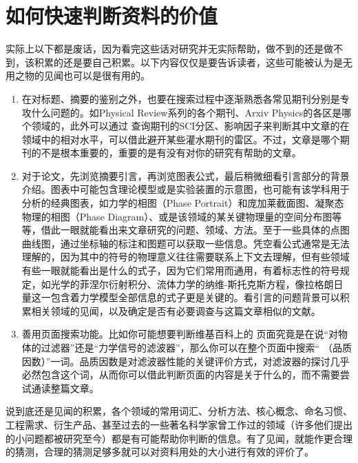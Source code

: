 \documentclass[a4paper,10pt,english]{sphinxmanual}
\begin{document}
\section{如何快速判断资料的价值}
\label{\detokenize{5. GetInfo:id4}}
实际上以下都是废话，因为看完这些话对研究并无实际帮助，做不到的还是做不到，该积累的还是要自己积累。以下内容仅仅是要告诉读者，这些可能被认为是无用之物的见闻也可以是很有用的。
\begin{enumerate}
\item {} 
在对标题、摘要的鉴别之外，也要在搜索过程中逐渐熟悉各常见期刊分别是专攻什么问题的。如Physical Review系列的各个期刊、Arxiv Physics的各区是哪个领域的，此外可以通过  查询期刊的SCI分区、影响因子来判断其中文章的在领域中的相对水平，可以借此避开某些灌水期刊的雷区。不过，文章是哪个期刊的不是根本重要的，重要的是有没有对你的研究有帮助的文章。

\item {} 
对于论文，先浏览摘要引言，再浏览图表公式，最后稍微细看引言部分的背景介绍。图表中可能包含理论模型或是实验装置的示意图，也可能有该学科用于分析的经典图表，如力学的相图（Phase Portrait）和庞加莱截面图、凝聚态物理的相图（Phase Diagram）、或是该领域的某关键物理量的空间分布图等等，借此一眼就能看出来文章研究的问题、领域、方法。至于一些具体的点图曲线图，通过坐标轴的标注和图题可以获取一些信息。凭空看公式通常是无法理解的，因为其中的符号的物理意义往往需要联系上下文去理解，但有些领域有些一眼就能看出是什么的式子，因为它们常用而通用，有着标志性的符号规定，如光学的菲涅尔衍射积分、流体力学的纳维-斯托克斯方程，像拉格朗日量这一包含着力学模型全部信息的式子更是关键的。看引言的问题背景可以积累相关领域的见闻，以及确定是否有必要调查与这篇文章相似的文献。

\item {} 
善用页面搜索功能。比如你可能想要判断维基百科上的  页面究竟是在说“对物体的过滤器”还是“力学信号的滤波器”，那么你可以在整个页面中搜索“  （品质因数）”一词。品质因数是对滤波器性能的关键评价方式，对滤波器的探讨几乎必然包含这个词，从而你可以借此判断页面的内容是关于什么的，而不需要尝试通读整篇文章。

\end{enumerate}

说到底还是见闻的积累，各个领域的常用词汇、分析方法、核心概念、命名习惯、工程需求、衍生产品、甚至过去的一些著名科学家曾工作过的领域（许多他们提出的小问题都被研究至今）都是有可能帮助你判断的信息。有了见闻，就能作更合理的猜测，合理的猜测足够多就可以对资料用处的大小进行有效的评价了。
\end{document}
